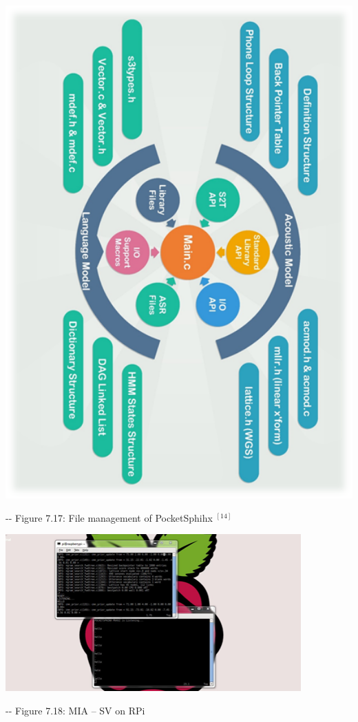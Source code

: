 \documentclass[12pt]{article}
\makeatletter
\newenvironment{indentation}[3]%
	{\par\setlength{\parindent}{#3}
	\setlength{\leftmargin}{#1}       \setlength{\rightmargin}{#2}%
	\advance\linewidth -\leftmargin       \advance\linewidth -\rightmargin%
	\advance\@totalleftmargin\leftmargin  \@setpar{{\@@par}}%
	\parshape 1\@totalleftmargin \linewidth\ignorespaces}{\par}%
\makeatother
\begin{document}
\includegraphics[width=451pt]{img-30.png}\textbf{{\large  }}
\begin{center}
\begin{indentation}{0pt}{0pt}{0pt}
Figure 7.17: File management of PocketSphihx 
$^{[14]}$

\end{indentation}
\end{center}
\includegraphics[width=322pt]{img-31.png}
\begin{center}
\begin{indentation}{0pt}{0pt}{0pt}
Figure 7.18: MIA -- SV on RPi
\end{indentation}
\end{center}
\end{document}
